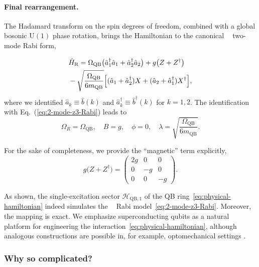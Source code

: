 \documentclass[reprint, aps, prx, amsmath, amssymb, longbibliography, superscriptaddress]{revtex4-2}
\DeclareMathOperator{\Zthree}{\mathbb{Z}_3}
\begin{document}
\paragraph{Final rearrangement.}
The Hadamard transform on the spin degrees of freedom, combined with a global
bosonic $\mathrm{U(1)}$ phase rotation, brings the Hamiltonian to the canonical
$\Zthree$ two-mode Rabi form,

\begin{align}
\label{eq:effective-rabi}
    &\hat H_{\text{R}} = \Omega_{\text{QB}}
      \bigl( \hat a^{\dagger}_1 \hat a_1 + \hat a^{\dagger}_2 \hat a_2 \bigr)
      + g \bigl( Z + Z^{\dagger} \bigr) \notag
      \\
      &- \sqrt{ \frac{\Omega_{\text{QB}}}{6 m_{\text{QB}}} }
      \Bigl[ ( \hat a_1 + \hat a^{\dagger}_2 ) X
        + ( \hat a_2 + \hat a^{\dagger}_1 ) X^{\dagger} \Bigr],
\end{align}
where we identified $\hat a_k \equiv \hat b(k)$ and $\hat a_k^{\dagger} \equiv \hat b^{\dagger}(k)$ for $k = 1,2$. The identification with Eq.~(\ref{eq:2-mode-z3-Rabi}) leads to
\begin{equation}
\label{eq:QB-RM-parameter-mapping}
  \Omega_R = \Omega_{\text{QB}},
  \quad B = g,
  \quad \phi = 0,
  \quad \lambda = \sqrt{ \frac{\Omega_{\text{QB}}}{6 m_{\text{QB}}} }.
\end{equation}

For the sake of completeness, we provide the ``magnetic'' term explicitly,
\begin{equation}
\label{eq:superconducting-magnetic-term}
  g \bigl( Z + Z^{\dagger} \bigr) =
  \begin{pmatrix}
    2 g & 0 & 0 \\
    0 & -g & 0 \\
    0 & 0 & -g
  \end{pmatrix}.
\end{equation}

As shown, the single-excitation sector $\mathcal{H}_{\text{QB},1}$ of the QB ring~\eqref{eq:physical-hamiltonian} indeed simulates the $\Zthree$ Rabi model~\eqref{eq:2-mode-z3-Rabi}. Moreover, the mapping is exact. We emphasize superconducting qubits as a natural platform for engineering the
interaction~\eqref{eq:physical-hamiltonian}, although analogous constructions are
possible in, for example, optomechanical settings \cite{sedov_chiral_2020}.


\subsubsection{Why so complicated?}
\end{document}
